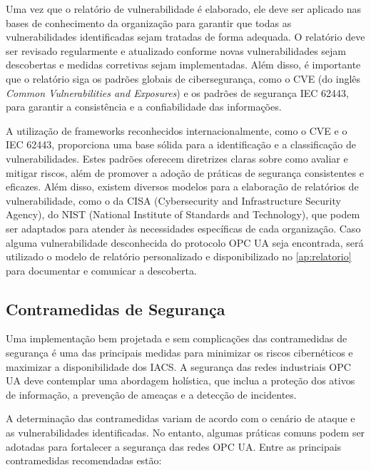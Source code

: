     Uma vez que o relatório de vulnerabilidade é elaborado, ele deve ser aplicado nas bases de conhecimento da organização para garantir que todas as vulnerabilidades identificadas sejam tratadas de forma adequada. O relatório deve ser revisado regularmente e atualizado conforme novas vulnerabilidades sejam descobertas e medidas corretivas sejam implementadas. Além disso, é importante que o relatório siga os padrões globais de cibersegurança, como o CVE (do inglês \textit{Common Vulnerabilities and Exposures}) e os padrões de segurança IEC 62443, para garantir a consistência e a confiabilidade das informações.

    A utilização de frameworks reconhecidos internacionalmente, como o CVE e o IEC 62443, proporciona uma base sólida para a identificação e a classificação de vulnerabilidades. Estes padrões oferecem diretrizes claras sobre como avaliar e mitigar riscos, além de promover a adoção de práticas de segurança consistentes e eficazes. Além disso, existem diversos modelos para a elaboração de relatórios de vulnerabilidade, como o da CISA (Cybersecurity and Infrastructure Security Agency), do NIST (National Institute of Standards and Technology), que podem ser adaptados para atender às necessidades específicas de cada organização. Caso alguma vulnerabilidade desconhecida do protocolo OPC UA seja encontrada, será utilizado o modelo de relatório personalizado e disponibilizado no \autoref{ap:relatorio} para documentar e comunicar a descoberta.

    \subsection{Contramedidas de Segurança}

    Uma implementação bem projetada e sem complicações das contramedidas de segurança é uma das principais medidas para minimizar os riscos cibernéticos e maximizar a disponibilidade dos IACS. A segurança das redes industriais OPC UA deve contemplar uma abordagem holística, que inclua a proteção dos ativos de informação, a prevenção de ameaças e a detecção de incidentes.

    A determinação das contramedidas variam de acordo com o cenário de ataque e as vulnerabilidades identificadas. No entanto, algumas práticas comuns podem ser adotadas para fortalecer a segurança das redes OPC UA. Entre as principais contramedidas recomendadas estão:

    

